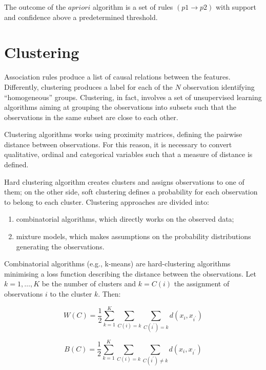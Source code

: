 The outcome of the $apriori$ algorithm is a set of rules $(p1\rightarrow p2)$ with support and confidence above a predetermined threshold.


\section{Clustering} \label{secClustering}
Association rules produce a list of causal relations between the features. Differently, clustering produces a label for each of the $N$ observation identifying “homogeneous” groups. Clustering, in fact, involves a set of unsupervised learning algorithms aiming at grouping the observations into subsets such that the observations in the same subset are close to each other. \par
Clustering algorithms works using proximity matrices, defining the pairwise distance between observations. For this reason, it is necessary to convert qualitative, ordinal and categorical variables such that a measure of distance is defined. \par
Hard clustering algorithm creates clusters and assigns observations to one of them; on the other side, soft clustering defines a probability for each observation to belong to each cluster. Clustering approaches are divided into:
\begin{enumerate}
    \item combinatorial algorithms, which directly works on the observed data;
    \item mixture models, which makes assumptions on the probability distributions generating the observations.
\end{enumerate}

Combinatorial algorithms (e.g., k-means) are hard-clustering algorithms minimising a loss function describing the distance between the observations. Let $k=1,\ldots,K$ be the number of clusters and $k=C(i)$ the assignment of observations $i$ to the cluster $k$. Then:

\begin{equation}
W\left(C\right)=\frac{1}{2}\sum_{k=1}^{K}\sum_{C\left(i\right)=k}\sum_{C\left(i^\prime\right)=k}{d(x_i,x_{i^\prime})}
\label{eq_clustering1}
\end{equation}

\begin{equation}
B\left(C\right)=\frac{1}{2}\sum_{k=1}^{K}\sum_{C\left(i\right)=k}\sum_{C\left(i^\prime\right)\neq k}{d(x_i,x_{i^\prime})}
\label{eq_clustering2}
\end{equation}

